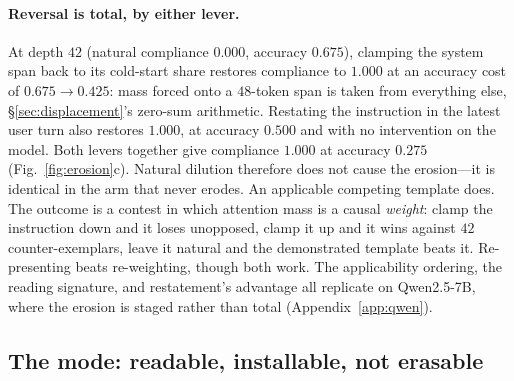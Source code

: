 \documentclass{article}
\begin{document}
\paragraph{Reversal is total, by either lever.}
At depth $42$ (natural compliance $0.000$, accuracy $0.675$), clamping the system span back to
its cold-start share restores compliance to $1.000$ at an accuracy cost of $0.675\to0.425$:
mass forced onto a $48$-token span is taken from everything else, \S\ref{sec:displacement}'s
zero-sum arithmetic. Restating the instruction in the latest user turn also restores $1.000$,
at accuracy $0.500$ and with no intervention on the model. Both levers together give compliance
$1.000$ at accuracy $0.275$ (Fig.~\ref{fig:erosion}c). Natural dilution therefore does not cause the erosion---it is
identical in the arm that never erodes. An applicable competing template does. The outcome is a
contest in which attention mass is a causal \emph{weight}: clamp the instruction down and it
loses unopposed, clamp it up and it wins against $42$ counter-exemplars, leave it natural and
the demonstrated template beats it. Re-presenting beats re-weighting, though both work. The
applicability ordering, the reading signature, and restatement's advantage all replicate on
Qwen2.5-7B, where the erosion is staged rather than total (Appendix~\ref{app:qwen}).

\subsection{The mode: readable, installable, not erasable}
\label{sec:mode}
\end{document}
